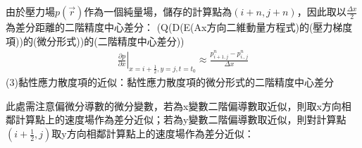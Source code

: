 \documentclass[12pt]{article}
\begin{document}
由於壓力場$p(\vec{r})$作為一個純量場，儲存的計算點為$(i+n,j+n)$，因此取以$\frac{\Delta x}{2}$為差分距離的二階精度中心差分：
\noindent 
(Q(D(E(Ax方向二維動量方程式)的(壓力梯度項))的(微分形式))的(二階精度中心差分))
\begin{equation}\begin{split}
    \left.\frac{\partial p}{\partial x}\right|_{x = i+\frac{1}{2} , y = j,t = t_0} \approx \frac{p_{i+1,j}^{n} - p_{i.,j}^{n}}{\Delta x}
\end{split}\end{equation}
\noindent (3)黏性應力散度項的近似：黏性應力散度項的微分形式的二階精度中心差分

此處需注意偏微分導數的微分變數，若為x變數二階偏導數取近似，則取x方向相鄰計算點上的速度場作為差分近似；若為y變數二階偏導數取近似，則對計算點$(i+\frac{1}{2},j)$取y方向相鄰計算點上的速度場作為差分近似：
\end{document}

